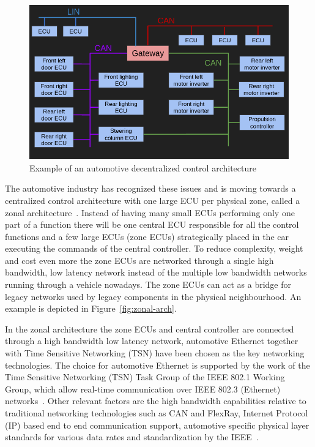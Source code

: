 \begin{figure}[htb]
    \centering
    \includegraphics[width=\textwidth]{images/functional-arch.png}
    \caption{Example of an automotive decentralized control architecture}
    \label{fig:functional-arch}
\end{figure}

The automotive industry has recognized these issues and is moving towards a centralized control architecture with one large ECU per physical zone, called a zonal architecture~\cite{ashjaei2021time}. Instead of having many small ECUs performing only one part of a function there will be one central ECU responsible for all the control functions and a few large ECUs (zone ECUs) strategically placed in the car executing the commands of the central controller. To reduce complexity, weight and cost even more the zone ECUs are networked through a single high bandwidth, low latency network instead of the multiple low bandwidth networks running through a vehicle nowadays. The zone ECUs can act as a bridge for legacy networks used by legacy components in the physical neighbourhood. An example is depicted in Figure~\ref{fig:zonal-arch}.

In the zonal architecture the zone ECUs and central controller are connected through a high bandwidth low latency network, automotive Ethernet together with Time Sensitive Networking (TSN) have been chosen as the key networking technologies. The choice for automotive Ethernet is supported by the work of the Time Sensitive Networking (TSN) Task Group of the IEEE 802.1 Working Group, which allow real-time communication over IEEE 802.3 (Ethernet) networks~\cite{klaus2019zonal}. Other relevant factors are the high bandwidth capabilities relative to traditional networking technologies such as CAN and FlexRay, Internet Protocol (IP) based end to end communication support, automotive specific physical layer standards for various data rates and standardization by the IEEE~\cite{ashjaei2021time}.

